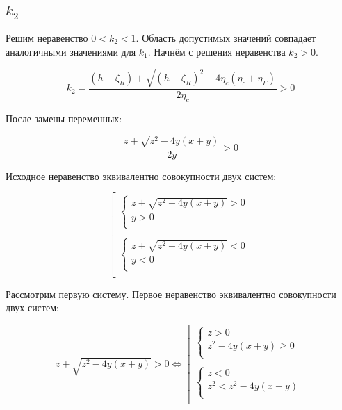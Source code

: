 \subsection{$k_2$}

Решим неравенство $0<k_2<1$. Область допустимых значений совпадает аналогичными значениями для $k_1$. Начнём с решения неравенства $k_2>0$.

$$
k_2 = \dfrac{(h-\zeta_R)+\sqrt{(h-\zeta_R)^2-4\eta_c(\eta_c+\eta_F)}}{2\eta_c}>0
$$

После замены переменных:

$$
\dfrac{z+\sqrt{z^2-4y(x+y)}}{2y}>0
$$

Исходное неравенство эквивалентно совокупности двух систем:

$$
\left[
\begin{array}{l}
    \left\{
    \begin{array}{l}
     z+\sqrt{z^2-4y(x+y)}>0\\
     y>0\\
    \end{array}
    \right.\\
    \\
    \left\{
    \begin{array}{l}
     z+\sqrt{z^2-4y(x+y)}<0\\
     y<0\\
    \end{array}
    \right.\\
\end{array}
\right.
$$

Рассмотрим первую систему. Первое неравенство эквивалентно совокупности двух систем:

$$
z+\sqrt{z^2-4y(x+y)}>0 \Leftrightarrow 
\left[
    \begin{array}{l}
        \left\{
            \begin{array}{l}
             z>0\\
             z^2-4y(x+y)\geq 0\\
            \end{array}
        \right.\\
        \\
        \left\{
            \begin{array}{l}
             z<0\\
             z^2<z^2-4y(x+y)\\
            \end{array}
        \right.\\
    \end{array}
\right.
$$

